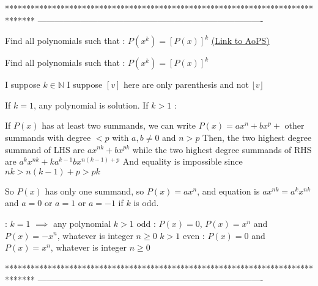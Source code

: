 *******************************************************************************
-------------------------------------------------------------------------------

\begin{problem}
	Find all polynomials such that : 
$ P(x^k)=[P(x)]^k$
	\flushright \href{https://artofproblemsolving.com/community/c6h533053}{(Link to AoPS)}
\end{problem}



\begin{solution}
	\begin{tcolorbox}Find all polynomials such that : 
$ P(x^k)=[P(x)]^k$\end{tcolorbox}
I suppose $k\in\mathbb N$
I suppose $[v]$ here are only parenthesis and not $\lfloor v\rfloor$

If $k=1$, any polynomial is solution.
If $k>1$ :

If $P(x)$ has at least two summands, we can write $P(x)=ax^n+bx^p+$ other summands with degree $<p$ with $a,b\ne 0$ and $n>p$
Then, the two highest degree summand of LHS are $ax^{nk}+bx^{pk}$ while the two highest degree summands of RHS are $a^kx^{nk}+ka^{k-1}bx^{n(k-1)+p}$
And equality is impossible since $nk>n(k-1)+p>pk$

So $P(x)$ has only one summand, so $P(x)=ax^n$, and equation is $ax^{nk}=a^kx^{nk}$ and $a=0$ or $a=1$ or $a=-1$ if $k$ is odd.

 :
$k=1$ $\implies$ any polynomial
$k>1$ odd : $P(x)=0$, $P(x)=x^n$ and $P(x)=-x^n$, whatever is integer $n\ge 0$
$k>1$ even : $P(x)=0$ and $P(x)=x^n$, whatever is integer $n\ge 0$
\end{solution}
*******************************************************************************
-------------------------------------------------------------------------------

